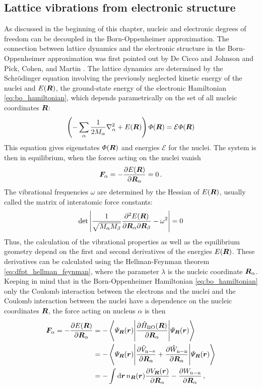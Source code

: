 \documentclass[main.tex]{subfiles}
\begin{document}
\subsection{Lattice vibrations from electronic structure}

As discussed in the beginning of this chapter, nucleic and electronic degrees of freedom can be decoupled in the Born-Oppenheimer approximation.
The connection between lattice dynamics and the electronic structure in the Born-Oppenheimer approximation was first pointed out by De Cicco and Johnson  \cite{decicco_quantum_1969} and Pick, Cohen, and Martin \cite{pick_microscopic_1970}.
The lattice dynamics are determined by the Schrödinger equation involving the previously neglected kinetic energy of the nuclei and \(E(\vb*{R})\), the ground-state energy of the electronic Hamiltonian \ref{eq:bo_hamiltonian}, which depends parametrically on the set of all nucleic coordinates \(\vb*{R}\):
\begin{equation}
    \left( - \sum_{\alpha} \frac{1}{2 M_{\alpha}} \nabla^2_{\alpha} + E(\vb*{R}) \right) \Phi (\vb*{R}) = \mathcal{E} \Phi (\vb*{R})
\end{equation}
This equation gives eigenstates \(\Phi (\vb*{R})\) and energies \(\mathcal{E}\) for the nuclei.
The system is then in equilibrium, when the forces acting on the nuclei vanish
\begin{equation}
    \vb*{F}_{\alpha} = - \pdv{E(\vb*{R})}{\vb*{R}_{\alpha}} = 0\,.
\end{equation}
The vibrational frequencies \(\omega\) are determined by the Hessian of \(E(\vb*{R})\), usually called the matrix of interatomic force constants:
\begin{equation}
    \det \left\vert \frac{1}{\sqrt{M_{\alpha} M_{\beta}}} \pdv{E(\vb*{R})}{\vb*{R}_{\alpha}}{\vb*{R}_{\beta}} - \omega^2 \right\vert = 0
\end{equation}
Thus, the calculation of the vibrational properties as well as the equilibrium geometry depend on the first and second derivatives of the energies \(E(\vb*{R})\).
These derivatives can be calculated using the Hellman-Feynman theorem \ref{eq:dfpt_hellman_feynman}, where the parameter \(\lambda\) is the nucleic coordinate \(\vb*{R}_{\alpha}\). 
Keeping in mind that in the Born-Oppenheimer Hamiltonian \ref{eq:bo_hamiltonian} only the Coulomb interaction between the electrons and the nuclei and the Coulomb interaction between the nuclei have a dependence on the nucleic coordinates \(\vb*{R}\), the force acting on nucleus \(\alpha\) is then
\begin{align}
    \vb*{F}_{\alpha} = - \pdv{E(\vb*{R})}{\vb*{R}_{\alpha}} &= - \mel**{\Psi_{\vb*{R}}(\vb*{r})}{\pdv{\hat{H}_{\mathrm{BO}} (\vb*{R})}{\vb*{R}_{\alpha}}}{\Psi_{\vb*{R}}(\vb*{r})} \\
    &= - \mel**{\Psi_{\vb*{R}}(\vb*{r})}{\pdv{\hat{V}_{\mathrm{n-e}}}{\vb*{R}_{\alpha}} + \pdv{\hat{W}_{\mathrm{n-n}}}{\vb*{R}_{\alpha}}}{\Psi_{\vb*{R}}(\vb*{r})} \\
    &= - \int \dd{\vb*{r}} n_{\vb*{R}} (\vb*{r}) \pdv{V_{\vb*{R}} (\vb*{r})}{\vb*{R}_{\alpha}} - \pdv{W_{\mathrm{n-n}}}{\vb*{R}_{\alpha}}\,,
\end{align}
\end{document}
